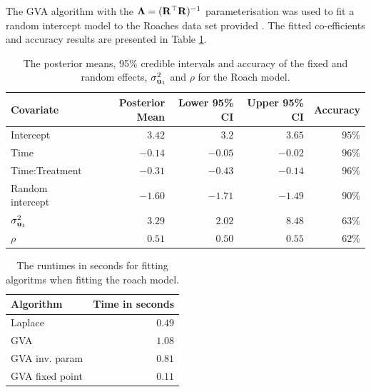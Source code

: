The GVA algorithm with the ${\boldsymbol \Lambda} = ({\bf R}^\top {\bf R})^{-1}$ parameterisation was used to fit a random
intercept model to the Roaches data set provided \cite{Gelman2007}. The fitted co-efficients and accuracy
results are presented in Table \ref{tab:application_roaches}.
		
		
		
\begin{table}
	\begin{tabular}{|l|rrrr|}
		\hline
		Covariate          & Posterior Mean & Lower 95\% CI & Upper 95\% CI & Accuracy \\
		\hline
		Intercept          & $3.42$						& $3.2$ 					& $3.65$          & $95\%$     \\
		Time               & $-0.14$        & $-0.05$       & $-0.02$       & $96\%$     \\
		Time:Treatment     & $-0.31$        & $-0.43$       & $-0.14$       & $96\%$     \\
		Random intercept   & $-1.60$        & $-1.71$       & $-1.49$       & $90\%$     \\
		$\sigma^2_{{\bf u}_1}$ & $3.29$           & $2.02$          & $8.48$          & $63\%$     \\
		$\rho$             & $0.51$           & $0.50$          & $0.55$          & $62\%$     \\
		\hline
	\end{tabular}
	\caption{The posterior means, 95\% credible intervals and accuracy of the fixed and random
						effects, $\sigma_{{\bf u}_1}^2$ and $\rho$ for the Roach model.}
	\label{tab:application_roaches}
\end{table}

\begin{table}
	\begin{tabular}{|lr|}
	\hline
	Algorithm & Time in seconds \\
	\hline
	Laplace & $0.49$ \\
	GVA & $1.08$ \\
	GVA inv. param & $0.81$ \\
	GVA fixed point & $0.11$ \\
	\hline
	\end{tabular}
	\label{tab:application_roaches_runtime}
	\caption{The runtimes in seconds for fitting algoritms when fitting the roach model.}
\end{table}
		

